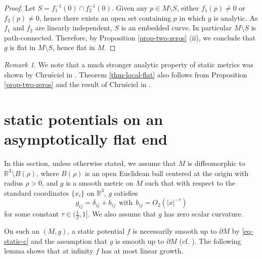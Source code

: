 \documentclass[12pt]{amsart}
\theoremstyle{remark}
\newtheorem{remark}{Remark}[section]
\numberwithin{equation}{section}
\newcommand{\R}{\mathbb R}
\newcommand{\be}{\begin{equation}}
\newcommand{\ee}{\end{equation}}
\def\p{\partial}
\begin{document}
\begin{proof}
Let $ S =   f_1^{-1} (0) \cap f_2^{-1} (0)$.
Given  any  $ p \in M \setminus S$, either $f_1 (p) \neq 0 $ or $ f_2 (p) \neq 0 $, hence there exists an open set containing $p$ in which $g$ is analytic.
As  $ f_1 $ and $ f_2 $ are linearly independent, $ S$ is an embedded curve. In particular $ M \setminus S $ is path-connected. Therefore,
by Proposition \ref{prop-two-zeros} (ii),  we conclude that $g$ is flat  in $M \setminus S$, hence flat in $M$.
\end{proof}

\begin{remark}
We note that a much stronger analytic property of static metrics was shown
by Chru\'{s}ciel in \cite[Section 4]{Chrusciel-analytic}.
Theorem \ref{thm-local-flat} also follows  from  Proposition \ref{prop-two-zeros} and
the result of Chru\'{s}ciel in \cite{Chrusciel-analytic}.
\end{remark}



\section{static potentials on  an asymptotically flat end} \label{section-AF}

In this section, unless otherwise stated,
we assume that $M$ is diffeomorphic  to $ \R^3 \setminus B(\rho)$,
where $B(\rho)$ is an open  Euclidean ball centered at the origin with radius $\rho>0$,
and $g$ is a smooth metric on $ M$ such that
with respect to the standard coordinates $\{x_i \}$ on $ \R^3$,
$g$ satisfies
\be\label{eq-AF-def}
g_{ij}=\delta_{ij}+b_{ij} \  \ \mathrm{with} \ \
b_{ij} = O_2 (|x|^{-\tau})
\ee
for some constant  $\tau \in ( \frac12 , 1]$.  We also assume  that $ g $ has zero scalar curvature.

On such an $(M, g)$, a static potential $f$ is necessarily 
smooth up  to  $\p M$ by   \eqref{eq-static-c} and the assumption  that 
$g$ is smooth up  to $ \p M$  (cf. \cite[Proposition 2.5]{Corvino}).
The following lemma shows that at infinity $f$ has  at most  linear growth. 
\end{document}
